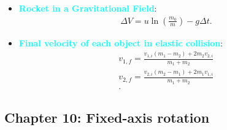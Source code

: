 \documentclass{report}
\begin{document}
\begin{itemize}
        \item \textbf{\textcolor{cyan}{Rocket in a Gravitational Field}}:
            \begin{align*}
                \Delta V = u\ln{\left(\frac{m_{0}}{m}\right)} - g\Delta t
            .\end{align*}
    \item \textbf{\textcolor{cyan}{Final velocity of each object in elastic collision}}:
        \begin{align*}
            v_{1,f} = \frac{v_{1,i}(m_{1} - m_{2}) + 2m_{2}v_{2,i}}{m_{1} + m_{2}} \\
            v_{2,f} = \frac{v_{2,i}(m_{2} - m_{1}) + 2m_{1}v_{1,i}}{m_{1} + m_{2}} \\
        .\end{align*}





    \end{itemize}

    \pagebreak 
    \subsection{Chapter 10: Fixed-axis rotation}
    \bigbreak \noindent 
\end{document}
